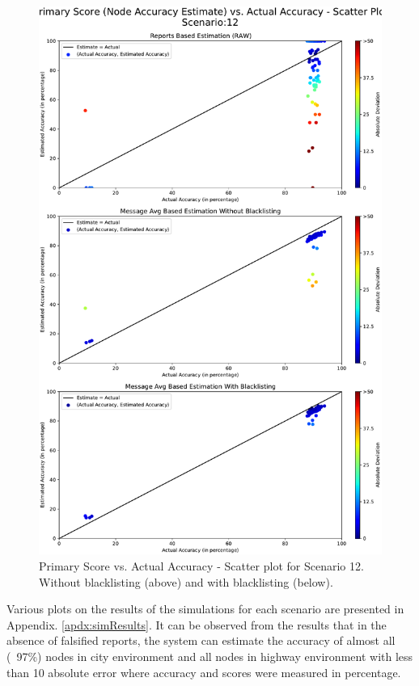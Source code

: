 \documentclass[journal]{IEEEtran}
\begin{document}
\begin{figure}[!t]
	\caption{Primary Score vs. Actual Accuracy - Scatter plot for Scenario 12. Without blacklisting (above) and with blacklisting (below).}
	\label{fig:plot:psscatterSCN12}
	\includegraphics[width=\linewidth, trim={0 5 15 420}, clip]{images/SCN12_PrimaryScoreVsActualAccuracyComparitive.pdf}
\end{figure}
Various plots on the results of the simulations for each scenario are presented in Appendix. \ref{apdx:simResults}. It can be observed from the results that in the absence of falsified reports, the system can estimate the accuracy of almost all (~97\%) nodes in city environment and all nodes in highway environment with less than 10 absolute error where accuracy and scores were measured in percentage.\\
\end{document}
